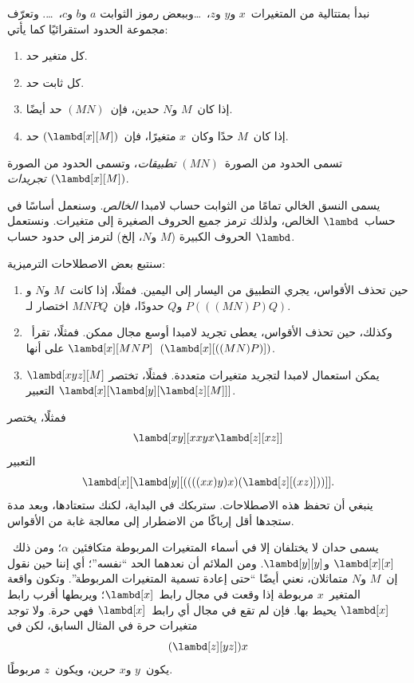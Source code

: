 \documentclass[../../../include/open-logic-section]{subfiles}
\begin{document}

نبدأ بمتتالية من المتغيرات~$x$ و$y$ و$z$،~\dots وببعض رموز الثوابت
$a$ و$b$ و$c$،~\dots. وتعرّف مجموعة الحدود استقرائيًا كما يأتي:
\begin{enumerate}
\item كل متغير حد.
\item كل ثابت حد.
\item إذا كان~$M$ و$N$ حدين، فإن~$(MN)$ حد أيضًا.
\item إذا كان~$M$ حدًا وكان~$x$ متغيرًا، فإن~$(\lambd[x][M])$ حد.
\end{enumerate}
تسمى الحدود من الصورة~$(MN)$ \emph{تطبيقات}، وتسمى الحدود من الصورة
$(\lambd[x][M])$ \emph{تجريدات}.

يسمى النسق الخالي تمامًا من الثوابت حساب لامبدا \emph{الخالص}. وسنعمل
أساسًا في حساب~$\lambd$ الخالص، ولذلك ترمز جميع الحروف الصغيرة إلى
متغيرات. ونستعمل الحروف الكبيرة ($M$ و$N$، إلخ) لترمز إلى حدود حساب
$\lambd$.

سنتبع بعض الاصطلاحات الترميزية:

\begin{conv}
\begin{enumerate}
\item حين تحذف الأقواس، يجري التطبيق من اليسار إلى اليمين. فمثلًا، إذا
  كانت~$M$ و$N$ و$P$ و$Q$ حدودًا، فإن~$MNPQ$ اختصار لـ$(((MN)P)Q)$.
\item وكذلك، حين تحذف الأقواس، يعطى تجريد لامبدا أوسع مجال ممكن. فمثلًا،
  تقرأ~$\lambd[x][MNP]$ على أنها~$(\lambd[x][((MN)P)])$.
\item يمكن استعمال لامبدا لتجريد متغيرات متعددة. فمثلًا، تختصر
  $\lambd[xyz][M]$ التعبير
  $\lambd[x][\lambd[y][\lambd[z][M]]]$.
\end{enumerate}
\end{conv}

فمثلًا، يختصر
\[
\lambd[xy][xxyx \lambd[z][xz]]
\]
التعبير
\[
\lambd[x][\lambd[y][((((xx)y)x)(\lambd[z][(xz)]))]].
\]
ينبغي أن تحفظ هذه الاصطلاحات. ستربكك في البداية، لكنك ستعتادها، وبعد
مدة ستجدها أقل إرباكًا من الاضطرار إلى معالجة غابة من الأقواس.

يسمى حدان لا يختلفان إلا في أسماء المتغيرات المربوطة متكافئين
$\alpha$؛ ومن ذلك~$\lambd[x][x]$ و$\lambd[y][y]$. ومن الملائم أن نعدهما
الحد ``نفسه''؛ أي إننا حين نقول إن~$M$ و$N$ متماثلان، نعني أيضًا
  ``حتى إعادة تسمية المتغيرات المربوطة''. وتكون واقعة المتغير~$x$
  مربوطة إذا وقعت في مجال رابط~$\lambd[x]$؛ ويربطها أقرب رابط
  $\lambd[x]$ يحيط بها. فإن لم تقع في مجال أي رابط~$\lambd[x]$ فهي حرة.
  ولا توجد متغيرات حرة
في المثال السابق، لكن في
\[
(\lambd[z][yz])x
\]
  يكون~$y$ و$x$ حرين، ويكون~$z$ مربوطًا.
\end{document}
